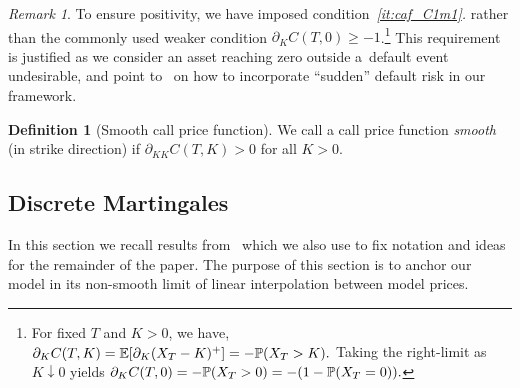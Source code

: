 \documentclass[twoside]{article}
\theoremstyle{plain}
\theoremstyle{definition}
\newtheorem{definition}[theorem]{Definition}
\theoremstyle{remark}
\newtheorem{remark}[theorem]{Remark}
\begin{document}
\begin{remark}
To ensure positivity, we have imposed condition~\textit{\ref{it:caf_C1m1}.}
rather than the commonly used  weaker condition $\partial_K C(T,0)\geq -1$.\footnote{
            For fixed $T$ and $K>0$, %
            we have, $ \partial_K C(T,K)
                =\E\!\left[\partial_K(X_T-K)^+\right]
                =-\P(X_T>K).$
            Taking the right-limit as $K\downarrow 0$ yields $\partial_K C(T,0)
                =-\P(X_T>0)
                =-(1-\P(X_T=0)).$}
 This requirement is justified as we consider an asset reaching  zero
outside a~default event undesirable, and point to~\cite{BuehlerVolAndDivs} on how to incorporate ``sudden'' default risk in our framework.
\end{remark}


\begin{definition}[Smooth call price function]
    We call a call price function \emph{smooth} (in strike direction) if $\partial_{KK} C(T,K) > 0$ for all $K>0$.
\end{definition}



\subsection{Discrete Martingales}


In this section we recall results from~\cite{DLV} which we also use to
fix notation and ideas for the remainder of the paper.  The purpose of this section is to anchor our
model in its non-smooth limit of linear interpolation between model prices.
\end{document}
